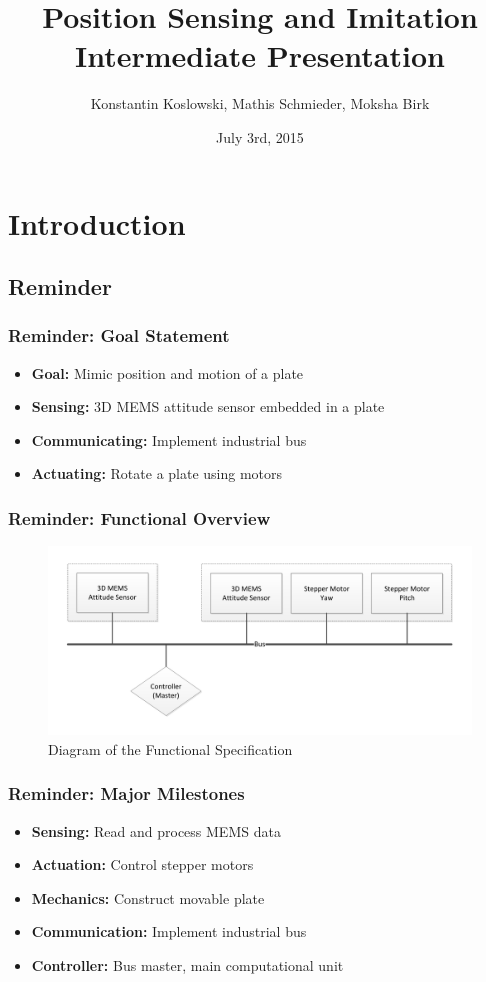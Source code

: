 \documentclass{beamer}
\title[NES Project: Intermediate Presentation]{Position Sensing and Imitation\\Intermediate Presentation}
\author[Koslowski, Schmieder, Birk]{Konstantin Koslowski, Mathis Schmieder, Moksha Birk}
\institute[]
{TU Berlin \\
 Department of Telecommunication Systems \\
 Telecommunication Networks Group \\
}
\date{July 3rd, 2015}
\begin{document}
\begin{frame}
  \titlepage
\end{frame}

\section{Introduction}
\subsection{Reminder}

\begin{frame}
  \frametitle{Reminder: Goal Statement}
	\begin{itemize}
		\item \textbf{Goal:} Mimic position and motion of a plate
		\vfill
		\item \textbf{Sensing:} 3D MEMS attitude sensor embedded in a plate
		\item \textbf{Communicating:} Implement industrial bus
		\item \textbf{Actuating:} Rotate a plate using motors
	\end{itemize}
\end{frame}

\begin{frame}
  \frametitle{Reminder: Functional Overview}
\begin{figure}
\includegraphics[width=\textwidth]{functionalspecification.pdf} 
\caption{Diagram of the Functional Specification}
\end{figure}
\end{frame}

\begin{frame}
  \frametitle{Reminder: Major Milestones}
	\begin{itemize}
		\item \textbf{Sensing:} Read and process MEMS data\\
		\item \textbf{Actuation:} Control stepper motors\\
		\item \textbf{Mechanics:} Construct movable plate\\
		\item \textbf{Communication:} Implement industrial bus\\
		\item \textbf{Controller:} Bus master, main computational unit\\
	\end{itemize}
\end{frame}
\end{document}
